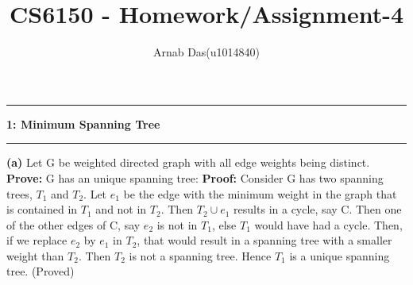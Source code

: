 \documentclass{article}
\title{CS6150 - Homework/Assignment-4}
\author{Arnab Das(u1014840)}
\newcommand\question[2]{\vspace{.25in}\hrule\textbf{#1: #2}\hrule\vspace{.10in}}
\renewcommand\part[1]{\vspace{.10in}\textbf{(#1)}}
\begin{document}
  \maketitle
  \newpage
  \newcommand\NAME{ARNAB DAS}
  \newcommand\UID{uxxxxxxx}
  \newcommand\HWNUM{4}
  
  \question{1}{Minimum Spanning Tree}
  \part{a} Let G be weighted directed graph with all edge weights being distinct. \textbf {Prove:} G has an unique spanning tree: \newline
  \textbf {Proof:} Consider G has two spanning trees, $T_{1}$ and $T_{2}$. Let $e_{1}$ be the edge with the minimum weight in the graph that is contained in $T_{1}$ and not in $T_{2}$. Then $T_{2} \cup e_{1}$ results in a cycle, say C. Then  one of the other edges of C, say $e_{2}$ is not in $T_{1}$, else $T_{1}$ would have had a cycle.  Then, if we replace $e_{2}$ by $e_{1}$ in $T_{2}$, that would result in a spanning tree with a smaller weight than $T_{2}$. Then $T_{2}$ is not a spanning tree. Hence $T_{1}$ is a unique spanning tree. (Proved) \newline
\end{document}
